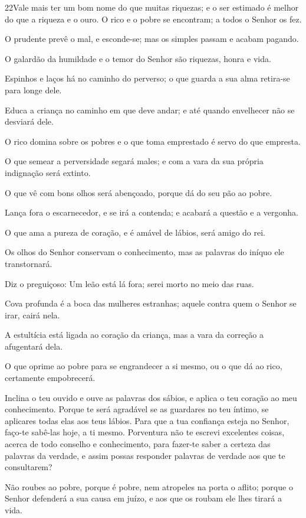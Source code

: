 \medskip

\lettrine{22}{}Vale mais ter um bom nome do que muitas
riquezas; e o ser estimado é melhor do que a riqueza e o ouro.
 O rico e o pobre se encontram; a todos o Senhor os
fez.

O prudente prevê o mal, e esconde-se; mas os simples passam e
acabam pagando.

O galardão da humildade e o temor do Senhor são riquezas, honra e
vida.

Espinhos e laços há no caminho do perverso; o que guarda a sua
alma retira-se para longe dele.

Educa a criança no caminho em que deve andar; e até quando
envelhecer não se desviará dele.

O rico domina sobre os pobres e o que toma emprestado é servo do
que empresta.

O que semear a perversidade segará males; e com a vara da sua
própria indignação será extinto.

O que vê com bons olhos será abençoado, porque dá do seu pão ao
pobre.

Lança fora o escarnecedor, e se irá a contenda; e acabará a
questão e a vergonha.

O que ama a pureza de coração, e é amável de lábios, será amigo
do rei.

Os olhos do Senhor conservam o conhecimento, mas as palavras do
iníquo ele transtornará.

Diz o preguiçoso: Um leão está lá fora; serei morto no meio das
ruas.

Cova profunda é a boca das mulheres estranhas; aquele contra quem
o Senhor se irar, cairá nela.

A estultícia está ligada ao coração da criança, mas a vara da
correção a afugentará dela.

O que oprime ao pobre para se engrandecer a si mesmo, ou o que dá
ao rico, certamente empobrecerá.

Inclina o teu ouvido e ouve as palavras dos sábios, e aplica o
teu coração ao meu conhecimento. Porque te será agradável se
as guardares no teu íntimo, se aplicares todas elas aos teus lábios.
Para que a tua confiança esteja no Senhor, faço-te sabê-las
hoje, a ti mesmo. Porventura não te escrevi excelentes
coisas, acerca de todo conselho e conhecimento, para fazer-te
saber a certeza das palavras da verdade, e assim possas responder
palavras de verdade aos que te consultarem?

Não roubes ao pobre, porque é pobre, nem atropeles na porta o
aflito; porque o Senhor defenderá a sua causa em juízo, e aos
que os roubam ele lhes tirará a vida.

